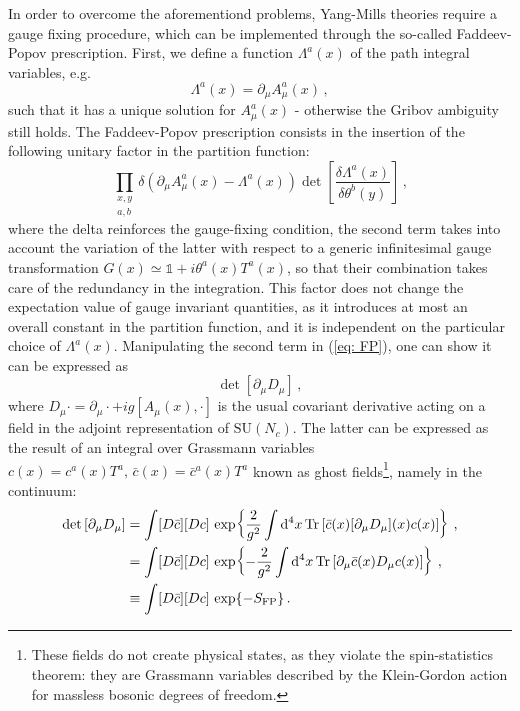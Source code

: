 \documentclass{article}
\begin{document}
In order to overcome the aforementiond problems, Yang-Mills theories require a gauge fixing procedure, which can be implemented through the so-called Faddeev-Popov prescription. First, we define a function $\Lambda^a(x)$ of the path integral variables, e.g.
\begin{equation}
    \Lambda^a(x) = \partial_{\mu} A_\mu^a(x) \, ,
\end{equation}
such that it has a unique solution for $A_\mu^a(x)$ - otherwise the Gribov ambiguity still holds.
The Faddeev-Popov prescription consists in the insertion of the following unitary factor in the partition function:
\begin{equation}\label{eq: FP}
    \prod_{\substack{x, y \\ a, b}} \delta(\partial_\mu A_\mu^a(x) - \Lambda^a(x)) \det \left[ \frac{\delta \Lambda^a(x)}{\delta \theta^b(y)} \right] \, ,
\end{equation}
where the delta reinforces the gauge-fixing condition, the second term takes into account the variation of the latter with respect to a generic infinitesimal gauge transformation $G(x) \simeq \mathbb{1} + i \theta^a(x)T^a(x)$, so that their combination takes care of the redundancy in the integration.
This factor does not change the expectation value of gauge invariant quantities, as it introduces at most an overall constant in the partition function, and it is independent on the particular choice of $\Lambda^a(x)$.
Manipulating the second term in (\ref{eq: FP}), one can show it can be expressed as
\begin{equation}
    \det \left[ \partial_\mu D_\mu \right] \, ,
\end{equation}
where $D_\mu \cdot = \partial_\mu \cdot + ig\left[A_\mu(x), \cdot \right]$ is the usual covariant derivative acting on a field in the adjoint representation of $\mathrm{SU}(N_c)$. The latter can be expressed as the result of an integral over Grassmann variables $c(x) = c^a(x)T^a, \, \bar{c}(x) = \bar{c}^a(x)T^a$ known as ghost fields\footnote{These fields do not create physical states, as they violate the spin-statistics theorem: they are Grassmann variables described by the Klein-Gordon action for massless bosonic degrees of freedom.}, namely in the continuum:
\begin{align*}
    \det \left[ \partial_\mu D_\mu \right] &= \int [D\bar{c}] [Dc] \, \exp \! \left\{ \frac{2}{g^2} \int \dd[4]{x} \Tr \left[ \bar{c}(x) [\partial_\mu D_\mu](x) c(x) \right] \right\} \, , \\
   &= \int [D\bar{c}] [Dc] \, \exp \! \left\{ -\frac{2}{g^2} \int \dd[4]{x} \Tr \left[ \partial_\mu \bar{c}(x) D_\mu c(x) \right] \right\} \, , \\
   &\equiv \int [D\bar{c}] [Dc] \, \exp{-S_{\textrm{FP}}} \, .
\end{align*}
\end{document}

